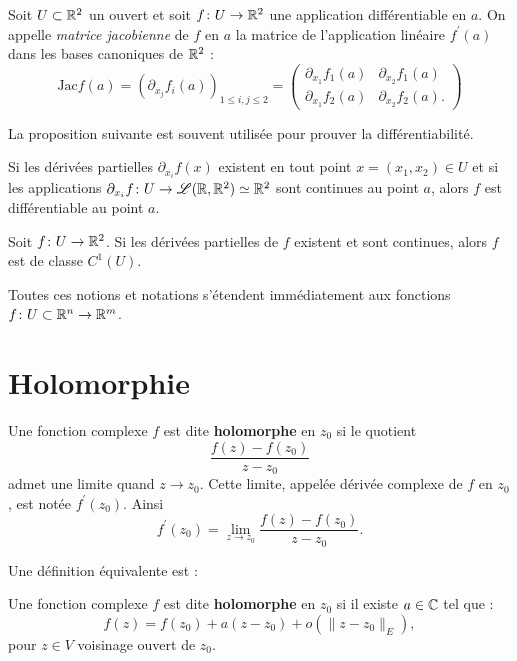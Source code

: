 \begin{definition}	Soit $U \subset \mathbb R^2$ un ouvert et soit $f \colon U \to \mathbb R^2$ une application différentiable en $a$. On appelle \textit{matrice jacobienne} de $f$ en $a$ la matrice de l'application linéaire $f^\prime(a)$ dans les bases canoniques de $\mathbb R^2$ :
\[\text{Jac} f(a) = \left( \partial_{x_j} f_i(a) \right)_{1 \leq i,j \leq 2}= \begin{pmatrix} \partial_{x_1} f_1(a) &\partial_{x_2} f_1(a) \\ \partial_{x_1} f_2(a) &\partial_{x_2} f_2(a).
\end{pmatrix}\]
\end{definition}

La proposition suivante est souvent utilisée pour prouver la différentiabilité. 

\begin{fprop} Si les dérivées partielles $\partial_{x_i} f(x)$ existent en tout point $x=(x_1,x_2) \in U$ et
   si les applications $\partial_{x_i}f \colon U \to \mathcal{L}(\mathbb R, \mathbb R^2) \simeq \mathbb R^2$ sont continues au point $a$,
    alors $f$ est différentiable au point $a$.
\end{fprop}

\begin{fprop}
Soit $f \colon U \to \mathbb R^2$. Si les dérivées partielles de $f$ existent et sont continues, alors $f$ est de classe $C^1(U)$.
\end{fprop}


Toutes ces notions et notations s'étendent immédiatement aux fonctions $f \colon U \subset \mathbb R^n \to \mathbb R^m$. 

\section{Holomorphie}
\begin{fdefn}
Une fonction complexe $f$ est dite \textbf{holomorphe} en $z_0$ si le quotient
\[\frac{f(z) - f(z_0)}{z - z_0}\]
admet une limite quand $z \rightarrow z_0$. Cette limite, appelée dérivée complexe de $f$ en $z_0$, est notée $f^\prime(z_0)$. Ainsi
\[f^\prime(z_0) = \lim_{z \rightarrow z_0}\frac{f(z) - f(z_0)}{z - z_0}.\]  
\end{fdefn}

Une définition équivalente est :
\begin{fdefn}
Une fonction complexe $f$ est dite \textbf{holomorphe} en $z_0$ si il existe $a \in \mathbb{C}$ tel que :
\[f(z)=f(z_0) + a(z-z_0) + o(\|z-z_0\|_E),\] pour $z \in V$ voisinage ouvert de $z_0$.
\end{fdefn}



